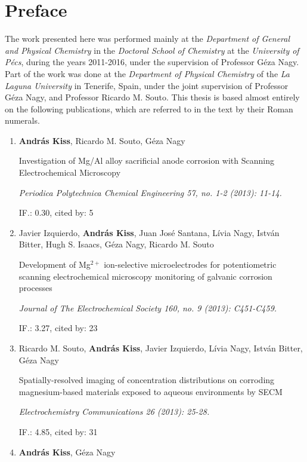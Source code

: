 \chapter*{Preface}
The work presented here was performed mainly at the \emph{Department of General and Physical Chemistry} in the \emph{Doctoral School of Chemistry} at the \emph{University of Pécs}, during the years 2011-2016, under the supervision of Professor Géza Nagy.
Part of the work was done at the \emph{Department of Physical Chemistry} of the \emph{La Laguna University} in Tenerife, Spain, under the joint supervision of Professor Géza Nagy, and Professor Ricardo M. Souto.
This thesis is based almost entirely on the following publications, which are referred to in the text by their Roman numerals.

\begin{enumerate}
\item \textbf{András Kiss}, Ricardo M. Souto, Géza Nagy

Investigation of Mg/Al alloy sacrificial anode corrosion with Scanning Electrochemical Microscopy

\emph{Periodica Polytechnica Chemical Engineering 57, no. 1-2 (2013): 11-14.}

IF.: 0.30, cited by: 5

\item Javier Izquierdo, \textbf{András Kiss}, Juan José Santana, Lívia Nagy, István Bitter, Hugh S. Isaacs, Géza Nagy, Ricardo M. Souto

Development of Mg$^{2+}$ ion-selective microelectrodes for potentiometric scanning electrochemical microscopy monitoring of galvanic corrosion processes

\emph{Journal of The Electrochemical Society 160, no. 9 (2013): C451-C459.}

IF.: 3.27, cited by: 23

\item Ricardo M. Souto, \textbf{András Kiss}, Javier Izquierdo, Lívia Nagy, István Bitter, Géza Nagy

Spatially-resolved imaging of concentration distributions on corroding mag\-ne\-si\-um-based materials exposed to aqueous environments by SECM

\emph{Electrochemistry Communications 26 (2013): 25-28.}

IF.: 4.85, cited by: 31

\newpage
\item \textbf{András Kiss}, Géza Nagy


\end{enumerate}
